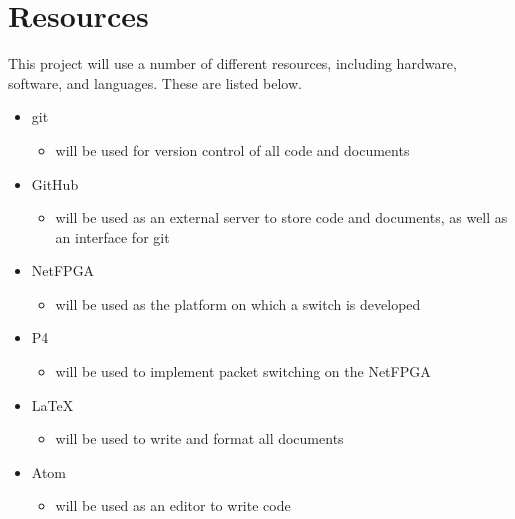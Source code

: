 \documentclass[12pt, a4paper, twoside, onecolumn]{article}
\begin{document}
\section{Resources}
\label{resources}
This project will use a number of different resources, including hardware, software, and languages. These are listed below.
\begin{itemize}
  \item git \cite{git}
    \begin{itemize}
      \item will be used for version control of all code and documents
    \end{itemize}
  \item GitHub \cite{github}
    \begin{itemize}
      \item will be used as an external server to store code and documents, as well as an interface for git
    \end{itemize}
  \item NetFPGA \cite{NetFPGA}
    \begin{itemize}
      \item will be used as the platform on which a switch is developed
    \end{itemize}
  \item P4 \cite{P4}
    \begin{itemize}
      \item will be used to implement packet switching on the NetFPGA
    \end{itemize}
  \item LaTeX \cite{latex}
    \begin{itemize}
      \item will be used to write and format all documents
    \end{itemize}
  \item Atom \cite{atom}
    \begin{itemize}
      \item will be used as an editor to write code
    \end{itemize}
\end{itemize}




\end{document}
